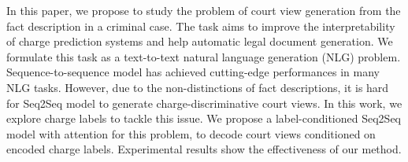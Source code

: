 In this paper, we propose to study the problem of court view generation from the fact description in a criminal case. The task aims to improve the interpretability of charge prediction systems and help automatic legal document generation. We formulate this task as a text-to-text natural language generation (NLG) problem. Sequence-to-sequence model has achieved cutting-edge performances in many NLG tasks. However, due to the non-distinctions of fact descriptions, it is hard for Seq2Seq model to generate charge-discriminative court views. In this work, we explore charge labels to tackle this issue. We propose a label-conditioned Seq2Seq model with attention for this problem, to decode court views conditioned on encoded charge labels. Experimental results show the effectiveness of our method.

